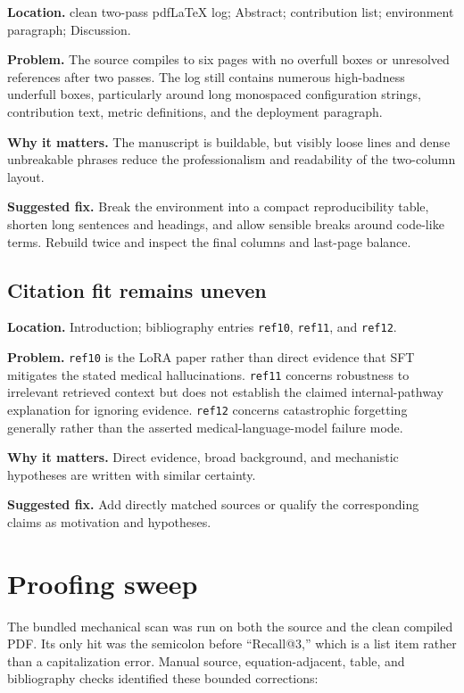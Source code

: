 \documentclass[11pt]{article}
\newcommand{\findinglabel}[1]{\textbf{#1}}
\begin{document}
\findinglabel{Location.} clean two-pass pdfLaTeX log; Abstract; contribution list; environment paragraph; Discussion.

\findinglabel{Problem.} The source compiles to six pages with no overfull boxes or unresolved references after two passes.  The log still contains numerous high-badness underfull boxes, particularly around long monospaced configuration strings, contribution text, metric definitions, and the deployment paragraph.

\findinglabel{Why it matters.} The manuscript is buildable, but visibly loose lines and dense unbreakable phrases reduce the professionalism and readability of the two-column layout.

\findinglabel{Suggested fix.} Break the environment into a compact reproducibility table, shorten long sentences and headings, and allow sensible breaks around code-like terms.  Rebuild twice and inspect the final columns and last-page balance.

\subsection*{Citation fit remains uneven}

\findinglabel{Location.} Introduction; bibliography entries \texttt{ref10}, \texttt{ref11}, and \texttt{ref12}.

\findinglabel{Problem.} \texttt{ref10} is the LoRA paper rather than direct evidence that SFT mitigates the stated medical hallucinations.  \texttt{ref11} concerns robustness to irrelevant retrieved context but does not establish the claimed internal-pathway explanation for ignoring evidence.  \texttt{ref12} concerns catastrophic forgetting generally rather than the asserted medical-language-model failure mode.

\findinglabel{Why it matters.} Direct evidence, broad background, and mechanistic hypotheses are written with similar certainty.

\findinglabel{Suggested fix.} Add directly matched sources or qualify the corresponding claims as motivation and hypotheses.

\section*{Proofing sweep}

The bundled mechanical scan was run on both the source and the clean compiled PDF.  Its only hit was the semicolon before ``Recall@3,'' which is a list item rather than a capitalization error.  Manual source, equation-adjacent, table, and bibliography checks identified these bounded corrections:
\end{document}
